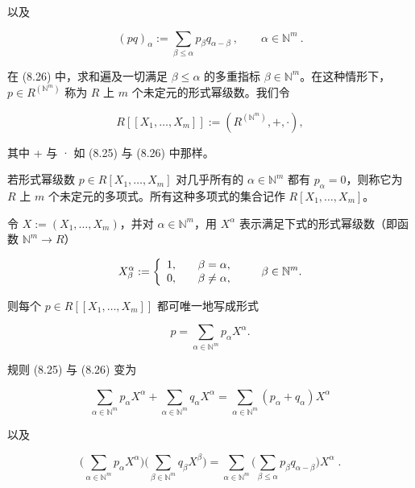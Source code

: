 以及

\begin{equation}
(p q)_{\alpha}:=\sum_{\beta\leq\alpha}p_{\beta}q_{\alpha-\beta}~,\qquad\alpha\in\mathbb{N}^{m}~.
\end{equation}

在 (8.26) 中，求和遍及一切满足  $ \beta \leq \alpha $ 的多重指标  $ \beta \in \mathbb{N}^m $。在这种情形下， $ p \in R^{(\mathbb{N}^m)} $ 称为 $ R $ 上 $ m $ 个未定元的形式幂级数。我们令

\[
R[\left[X_{1},\ldots,X_{m}\right]]:=\left(R^{(\mathbb{N}^{m})},+,\cdot\right),
\]

其中 + 与 · 如 (8.25) 与 (8.26) 中那样。

若形式幂级数  $ p \in R[X_1, \ldots, X_m] $ 对几乎所有的  $ \alpha \in \mathbb{N}^m $ 都有  $ p_\alpha = 0 $，则称它为 $ R $ 上 $ m $ 个未定元的多项式。所有这种多项式的集合记作  $ R[X_1, \ldots, X_m] $。

令  $ X := (X_1, \ldots, X_m) $，并对  $ \alpha \in \mathbb{N}^m $，用  $ X^\alpha $ 表示满足下式的形式幂级数（即函数  $ \mathbb{N}^m \to R $）

\begin{equation*}
X_{\beta}^{\alpha}:=\left\{\begin{array}{l l}{1,}&{\quad\beta=\alpha,}\\ {0,}&{\quad\beta\neq\alpha,}\\ \end{array}\right.\qquad\beta\in\mathbb{N}^{m}.
\end{equation*}

则每个 $p \in R[[X_1,\ldots,X_m]]$ 都可唯一地写成形式

\[
p=\sum_{\alpha\in\mathbb{N}^{m}}p_{\alpha}X^{\alpha}.
\]

规则 (8.25) 与 (8.26) 变为

\begin{equation}
\sum_{\alpha\in\mathbb{N}^{m}}p_{\alpha}X^{\alpha}+\sum_{\alpha\in\mathbb{N}^{m}}q_{\alpha}X^{\alpha}=\sum_{\alpha\in\mathbb{N}^{m}}(p_{\alpha}+q_{\alpha})X^{\alpha}
\end{equation}

以及

\begin{equation}
\Big(\sum_{\alpha\in\mathbb{N}^{m}}p_{\alpha}X^{\alpha}\Big)\Big(\sum_{\beta\in\mathbb{N}^{m}}q_{\beta}X^{\beta}\Big)=\sum_{\alpha\in\mathbb{N}^{m}}\Big(\sum_{\beta\leq\alpha}p_{\beta}q_{\alpha-\beta}\Big)X^{\alpha}\;.
\end{equation}

